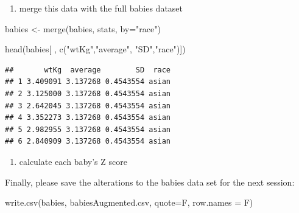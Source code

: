 \documentclass[
]{book}
\newenvironment{Shaded}{\begin{snugshade}}{\end{snugshade}}
\newcommand{\AttributeTok}[1]{\textcolor[rgb]{0.77,0.63,0.00}{#1}}
\newcommand{\FunctionTok}[1]{\textcolor[rgb]{0.00,0.00,0.00}{#1}}
\newcommand{\NormalTok}[1]{#1}
\newcommand{\OtherTok}[1]{\textcolor[rgb]{0.56,0.35,0.01}{#1}}
\newcommand{\SpecialCharTok}[1]{\textcolor[rgb]{0.00,0.00,0.00}{#1}}
\newcommand{\StringTok}[1]{\textcolor[rgb]{0.31,0.60,0.02}{#1}}
\providecommand{\tightlist}{%
  \setlength{\itemsep}{0pt}\setlength{\parskip}{0pt}}
\begin{document}
\begin{enumerate}
\def\labelenumi{\arabic{enumi}.}
\setcounter{enumi}{1}
\tightlist
\item
  merge this data with the full babies dataset
\end{enumerate}

\begin{Shaded}
\begin{Highlighting}[]
\NormalTok{babies }\OtherTok{\textless{}{-}} \FunctionTok{merge}\NormalTok{(babies, }
\NormalTok{                stats, }
                \AttributeTok{by=}\StringTok{"race"}\NormalTok{)}

\FunctionTok{head}\NormalTok{(babies[ , }\FunctionTok{c}\NormalTok{(}\StringTok{"wtKg"}\NormalTok{,}\StringTok{"average"}\NormalTok{, }\StringTok{"SD"}\NormalTok{,}\StringTok{"race"}\NormalTok{)])}
\end{Highlighting}
\end{Shaded}

\begin{verbatim}
##       wtKg  average        SD  race
## 1 3.409091 3.137268 0.4543554 asian
## 2 3.125000 3.137268 0.4543554 asian
## 3 2.642045 3.137268 0.4543554 asian
## 4 3.352273 3.137268 0.4543554 asian
## 5 2.982955 3.137268 0.4543554 asian
## 6 2.840909 3.137268 0.4543554 asian
\end{verbatim}

\begin{enumerate}
\def\labelenumi{\arabic{enumi}.}
\setcounter{enumi}{2}
\tightlist
\item
  calculate each baby's Z score
\end{enumerate}

\begin{Shaded}
\end{Shaded}

Finally, please save the alterations to the babies data set for the next session:

\begin{Shaded}
\begin{Highlighting}[]
\FunctionTok{write.csv}\NormalTok{(babies, }\StringTok{\textquotesingle{}babiesAugmented.csv\textquotesingle{}}\NormalTok{, }\AttributeTok{quote=}\NormalTok{F, }\AttributeTok{row.names =}\NormalTok{ F)}
\end{Highlighting}
\end{Shaded}


  
\end{document}
